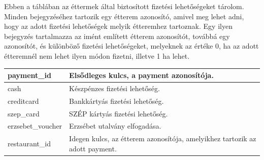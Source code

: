 Ebben a táblában az éttermek által biztosított fizetési lehetőségeket tárolom. Minden bejegyzéséhez tartozik egy étterem azonosító, amivel meg lehet adni, hogy az adott fizetési lehetőségek melyik étteremhez tartoznak. Egy ilyen bejegyzés tartalmazza az imént említett étterem azonosítót, továbbá egy azonosítót, és különböző fizetési lehetőségeket, melyeknek az értéke 0, ha az adott étteremnél nem lehet ilyen módon fizetni, illetve 1 ha lehet.

\begin{tabular}{|p{3cm}|p{10cm}|}
    payment\_id & Elsődleges kulcs, a payment azonosítója. \\
    \hline
    cash & Készpénzes fizetési lehetőség. \\
    \hline
    creditcard & Bankkártyás fizetési lehetőség. \\
    \hline
    szep\_card & SZÉP kártyás fizetési lehetőség. \\
    \hline
    erzsebet\_voucher & Erzsébet utalvány elfogadása. \\
    \hline
    restaurant\_id & Idegen kulcs, az étterem azonosítója, amelyikhez tartozik az adott payment. \\
    \hline
\end{tabular}

